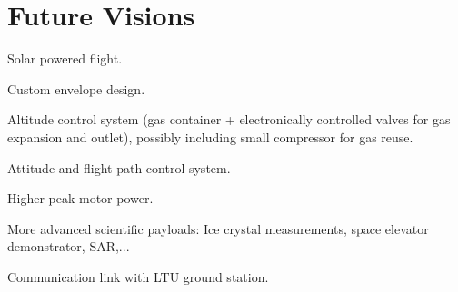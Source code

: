 \newpage
\chapter{Future Visions}
\label{chap:visions}

Solar powered flight.

Custom envelope design.

Altitude control system (gas container + electronically controlled valves for gas expansion and outlet), possibly including small compressor for gas reuse.

Attitude and flight path control system.

Higher peak motor power.

More advanced scientific payloads: Ice crystal measurements, space elevator demonstrator, SAR,...

Communication link with LTU ground station.

